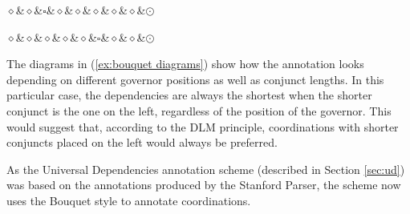 \begin{exe}
\begin{xlist}
\begin{paracol}{2}
\ex
\begin{dependency}[theme = simple, baseline=-\the\dimexpr\fontdimen22\textfont2\relax]
    \begin{deptext}
        $\diamond$\&$\diamond$\&$\square$\&$\diamond$\&$\diamond$\&$\diamond$\&$\diamond$\&$\diamond$\&$\odot$\\
    \end{deptext}
\end{dependency}

\switchcolumn

\ex
\begin{dependency}[theme = simple, baseline=-\the\dimexpr\fontdimen22\textfont2\relax]
    \begin{deptext}
        $\diamond$\&$\diamond$\&$\diamond$\&$\diamond$\&$\diamond$\&$\square$\&$\diamond$\&$\diamond$\&$\odot$\\
    \end{deptext}
\end{dependency}
\end{paracol}

\end{xlist}
\end{exe}

The diagrams in (\ref{ex:bouquet diagrams}) show how the annotation looks depending on different governor positions as well as conjunct lengths. In this particular case, the dependencies are always the shortest when the shorter conjunct is the one on the left, regardless of the position of the governor. This would suggest that, according to the DLM principle, coordinations with shorter conjuncts placed on the left would always be preferred. 

As the Universal Dependencies annotation scheme (described in Section \ref{sec:ud}) was based on the annotations produced by the Stanford Parser, the scheme now uses the Bouquet style to annotate coordinations. 